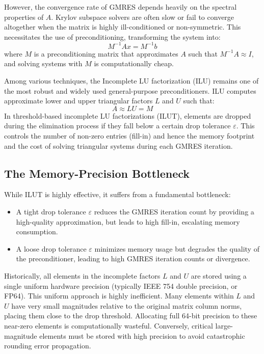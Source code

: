 \documentclass[11pt,a4paper]{article}
\begin{document}
However, the convergence rate of GMRES depends heavily on the spectral properties of $A$. Krylov subspace solvers are often slow or fail to converge altogether when the matrix is highly ill-conditioned or non-symmetric. This necessitates the use of preconditioning, transforming the system into:
\begin{equation}
    M^{-1}Ax = M^{-1}b
\end{equation}
where $M$ is a preconditioning matrix that approximates $A$ such that $M^{-1}A \approx I$, and solving systems with $M$ is computationally cheap.

Among various techniques, the Incomplete LU factorization (ILU) remains one of the most robust and widely used general-purpose preconditioners. ILU computes approximate lower and upper triangular factors $L$ and $U$ such that:
\begin{equation}
    A \approx LU = M
\end{equation}
In threshold-based incomplete LU factorizations (ILUT), elements are dropped during the elimination process if they fall below a certain drop tolerance $\varepsilon$. This controls the number of non-zero entries (fill-in) and hence the memory footprint and the cost of solving triangular systems during each GMRES iteration.

\subsection{The Memory-Precision Bottleneck}
While ILUT is highly effective, it suffers from a fundamental bottleneck:
\begin{itemize}
    \item A tight drop tolerance $\varepsilon$ reduces the GMRES iteration count by providing a high-quality approximation, but leads to high fill-in, escalating memory consumption.
    \item A loose drop tolerance $\varepsilon$ minimizes memory usage but degrades the quality of the preconditioner, leading to high GMRES iteration counts or divergence.
\end{itemize}

Historically, all elements in the incomplete factors $L$ and $U$ are stored using a single uniform hardware precision (typically IEEE 754 double precision, or FP64). This uniform approach is highly inefficient. Many elements within $L$ and $U$ have very small magnitudes relative to the original matrix column norms, placing them close to the drop threshold. Allocating full 64-bit precision to these near-zero elements is computationally wasteful. Conversely, critical large-magnitude elements must be stored with high precision to avoid catastrophic rounding error propagation.
\end{document}
